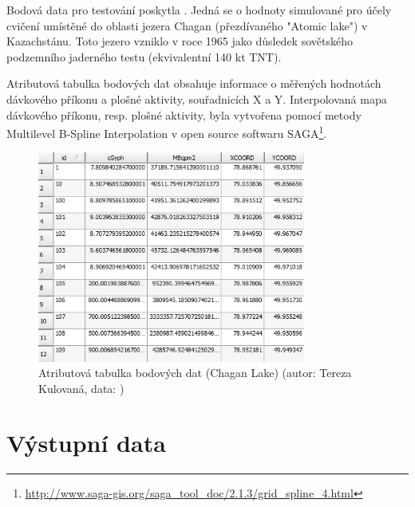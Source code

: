 Bodová data pro testování poskytla . Jedná se o hodnoty simulované pro účely cvičení umístěné do oblasti jezera Chagan (přezdívaného "Atomic lake") v Kazachstánu. Toto jezero vzniklo v roce 1965 jako důsledek sovětského podzemního jaderného testu (ekvivalentní 140 kt TNT)\cite{Nordyke2000}.

Atributová tabulka bodových dat obsahuje informace o měřených hodnotách dávkového příkonu a plošné aktivity, souřadnicích X a Y. Interpolovaná mapa dávkového příkonu, resp. plošné aktivity, byla vytvořena pomocí metody Multilevel B-Spline Interpolation v open source  softwaru SAGA\footnote{\url{http://www.saga-gis.org/saga_tool_doc/2.1.3/grid_spline_4.html}}.
  
\begin{figure}[H] \centering
      \includegraphics[width=250pt]{./pictures/chagan_attr.jpg}
      \caption[Atributová tabulka bodových dat (Chagan Lake)]{Atributová tabulka bodových dat (Chagan Lake) (autor: Tereza Kulovaná, data: )}
      \label{fig:attributes}
\end{figure}

\section{Výstupní data}

